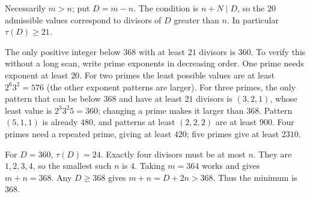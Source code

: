 Necessarily $m>n$; put $D=m-n$. The condition is $n+N\mid D$, so the $20$ admissible values correspond to divisors of $D$ greater than $n$. In particular $\tau(D)\ge21$.

The only positive integer below $368$ with at least $21$ divisors is $360$. To verify this without a long scan, write prime exponents in decreasing order. One prime needs exponent at least $20$. For two primes the least possible values are at least $2^6 3^2=576$ (the other exponent patterns are larger). For three primes, the only pattern that can be below $368$ and have at least $21$ divisors is $(3,2,1)$, whose least value is $2^3 3^2 5=360$; changing a prime makes it larger than $368$. Pattern $(5,1,1)$ is already $480$, and patterns at least $(2,2,2)$ are at least $900$. Four primes need a repeated prime, giving at least $420$; five primes give at least $2310$.

For $D=360$, $\tau(D)=24$. Exactly four divisors must be at most $n$. They are $1,2,3,4$, so the smallest such $n$ is $4$. Taking $m=364$ works and gives $m+n=368$. Any $D\ge368$ gives $m+n=D+2n>368$. Thus the minimum is $\boxed{368}$.
